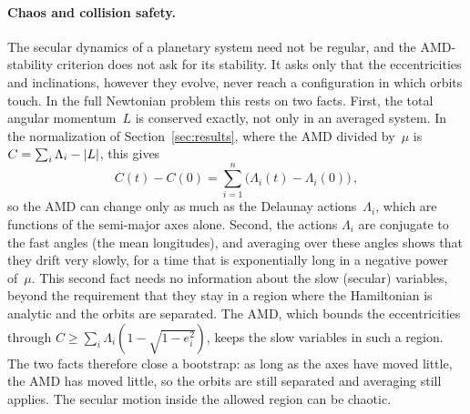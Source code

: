 \paragraph{Chaos and collision safety.} The secular dynamics of a planetary system need not be regular, and the AMD-stability criterion does not ask for its stability. It asks only that the eccentricities and inclinations, however they evolve, never reach a configuration in which orbits touch. In the full Newtonian problem this rests on two facts. First, the total angular momentum~$L$ is conserved exactly, not only in an averaged system. In the normalization of Section~\ref{sec:results}, where the AMD divided by~$\mu$ is $C=\sum_i\Lambda_i-\lvert L\rvert$, this gives
\begin{equation*}
C(t)-C(0)=\sum_{i=1}^n\big(\Lambda_i(t)-\Lambda_i(0)\big)\,,
\end{equation*}
so the AMD can change only as much as the Delaunay actions~$\Lambda_i$, which are functions of the semi-major axes alone. Second, the actions $\Lambda_i$ are conjugate to the fast angles (the mean longitudes), and averaging over these angles shows that they drift very slowly, for a time that is exponentially long in a negative power of~$\mu$. This second fact needs no information about the slow (secular) variables, beyond the requirement that they stay in a region where the Hamiltonian is analytic and the orbits are separated. The AMD, which bounds the eccentricities through $C\geq\sum_i\Lambda_i(1-\sqrt{1-e_i^2})$, keeps the slow variables in such a region. The two facts therefore close a bootstrap: as long as the axes have moved little, the AMD has moved little, so the orbits are still separated and averaging still applies. The secular motion inside the allowed region can be chaotic.

